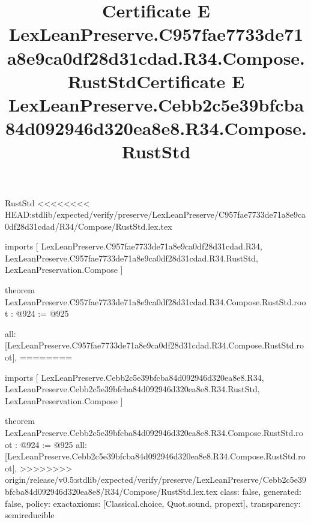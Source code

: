 \begin{lexlean}{RustStd}
<<<<<<<< HEAD:stdlib/expected/verify/preserve/LexLeanPreserve/C957fae7733de71a8e9ca0df28d31cdad/R34/Compose/RustStd.lex.tex
\title{Certificate E LexLeanPreserve.C957fae7733de71a8e9ca0df28d31cdad.R34.Compose.RustStd}
\begin{coremodule}
imports [
  LexLeanPreserve.C957fae7733de71a8e9ca0df28d31cdad.R34,
  LexLeanPreserve.C957fae7733de71a8e9ca0df28d31cdad.R34.RustStd,
  LexLeanPreservation.Compose
]

theorem LexLeanPreserve.C957fae7733de71a8e9ca0df28d31cdad.R34.Compose.RustStd.root : @924 := @925 {
  all: [LexLeanPreserve.C957fae7733de71a8e9ca0df28d31cdad.R34.Compose.RustStd.root],
========
\title{Certificate E LexLeanPreserve.Cebb2c5e39bfcba84d092946d320ea8e8.R34.Compose.RustStd}
\begin{coremodule}
imports [
  LexLeanPreserve.Cebb2c5e39bfcba84d092946d320ea8e8.R34,
  LexLeanPreserve.Cebb2c5e39bfcba84d092946d320ea8e8.R34.RustStd,
  LexLeanPreservation.Compose
]

theorem LexLeanPreserve.Cebb2c5e39bfcba84d092946d320ea8e8.R34.Compose.RustStd.root : @924 := @925 {
  all: [LexLeanPreserve.Cebb2c5e39bfcba84d092946d320ea8e8.R34.Compose.RustStd.root],
>>>>>>>> origin/release/v0.5:stdlib/expected/verify/preserve/LexLeanPreserve/Cebb2c5e39bfcba84d092946d320ea8e8/R34/Compose/RustStd.lex.tex
  class: false,
  generated: false,
  policy: exact{axioms: [Classical.choice, Quot.sound, propext]},
  transparency: semireducible
}


\end{coremodule}}
\end{coremodule}
\end{lexlean}

